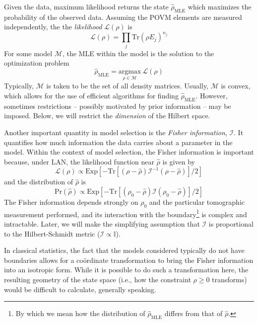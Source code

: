 \documentclass[aps,pra, twocolumn]{revtex4-1}
\newcommand{\M}{\mathcal{M}}
\newcommand{\rhohat}{\hat{\rho}}
\newcommand{\rhoMLE}{\rhohat_{\scriptscriptstyle\mathrm{MLE}}}
\begin{document}
Given the data, maximum likelihood returns the state $\rhoMLE$ which maximizes the probability of the observed data. Assuming the POVM elements are measured independently, the the \emph{likelihood} $\mathcal{L}(\rho)$ is
\begin{equation}
\mathcal{L}(\rho) = \prod_{j}\mathrm{Tr}(\rho E_{j})^{n_{j}}
\end{equation}
For some model $\M$, the MLE within the model is the solution to the optimization problem
\begin{equation}
\rhoMLE = \underset{\rho \in \M}{\text{argmax}}~\mathcal{L}(\rho)
\end{equation}
Typically, $\M$ is taken to be the set of all density matrices. Usually, $\M$ is convex, which allows for the use of efficient algorithms for finding $\rhoMLE$. However, sometimes restrictions -- possibly motivated by prior information -- may be imposed. Below, we will restrict the \emph{dimension} of the Hilbert space. 


Another important quantity in model selection is the \emph{Fisher information}, $\mathcal{I}$. It quantifies how much information the data carries about a parameter in the model.
Within the context of model selection, the Fisher information is important because, under LAN, the likelihood function near $\rhohat$ is given by
\begin{equation}
\mathcal{L}(\rho) \propto \text{Exp}\left[-\mathrm{Tr}[(\rho - \rhohat)\mathcal{I}^{-1}(\rho - \rhohat)]/2\right]
\end{equation}
and the distribution of $\rhohat$ is
\begin{equation}
\mathrm{Pr}(\rhohat) \propto \text{Exp}\left[-\mathrm{Tr}[(\rho_{0} - \rhohat)\mathcal{I}(\rho_{0} - \rhohat)]/2\right]
\end{equation}
The Fisher information depends strongly on $\rho_{0}$ and the particular tomographic measurement performed, and its interaction with the boundary\footnote{By which we mean how the distribution of $\rhoMLE$ differs from that of $\rhohat$.} is complex and intractable. Later, we will make the simplifying assumption that $\mathcal{I}$ is proportional to the Hilbert-Schmidt metric ($\mathcal{I} \propto \mathbb{I}$).

In classical statistics, the fact that the models considered typically do not have boundaries allows for a co\"{o}rdinate transformation to bring the Fisher information into an isotropic form. While it is possible to do such a transformation here, the resulting geometry of the state space (i.e., how the constraint $\rho \geq 0$ transforms) would be difficult to calculate, generally speaking.
\end{document}

